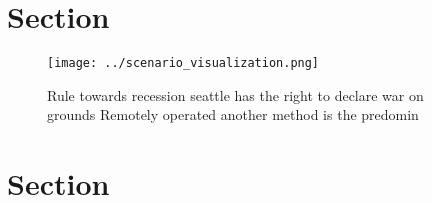 \documentclass[a4paper]{article}
\begin{document}
\section{Section}

\begin{figure}
\centering
\texttt{[image: ../scenario\_visualization.png]}
\caption{Rule towards recession seattle has the right to declare war on grounds Remotely operated another method is the predomin
}
\end{figure}
 
\section{Section}
\end{document}
